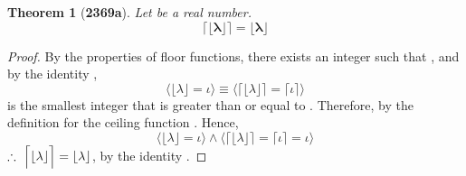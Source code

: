 \documentclass[preview]{standalone}
\newtheorem*{theorem*}{Theorem}
\begin{document}
\begin{theorem*}[\textbf{2369a}]
    Let \bm{$\lambda$} be a real number. 
    \begin{equation*}
        \bm{
            \Big \lceil \lfloor \lambda \rfloor \Big \rceil 
                = 
            \lfloor \lambda \rfloor
        }
    \end{equation*}
\end{theorem*}

\begin{proof}
    By the properties of floor functions, 
    there exists an integer \bm{$\iota$} such that
    \bm{$\lfloor \lambda \rfloor = \iota$}, 
    and by the identity \bm{$\iota$},
    \begin{equation*}
        \bigg \langle \lfloor \lambda \rfloor = \iota \bigg \rangle
            \equiv
        \bigg \langle 
            \Big \lceil \lfloor \lambda \rfloor \Big \rceil
                =
            \big \lceil \iota \big \rceil
        \bigg \rangle
    \end{equation*}
    \bm{$\iota$} is the smallest integer that is greater than or equal to \bm{$\iota$}.
    Therefore, by the definition for the ceiling function 
    \bm{$\lceil \iota \rceil = \iota$}.
    Hence,
    \begin{equation*}
        \bigg \langle \lfloor \lambda \rfloor = \iota \bigg \rangle
            \land
        \bigg \langle 
            \Big \lceil \lfloor \lambda \rfloor \Big \rceil
                =
            \lceil \iota \rceil
                =
            \iota
        \bigg \rangle
    \end{equation*}
    $\therefore \text{\space} \relax{
        \Big \lceil \lfloor \lambda \rfloor \Big \rceil 
            = 
        \lfloor \lambda \rfloor
    }$, by the identity \bm{$\iota$}.
\color{lightgray} \end{proof}
\end{document}
